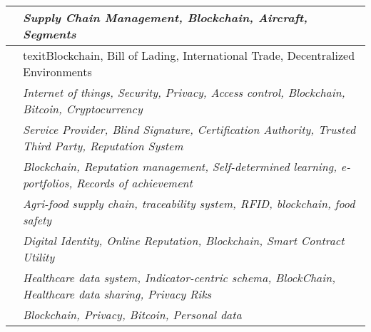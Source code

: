 \begin{longtable}{ |c|p{9cm}| }
	 \hline
 		\citet{2017_Madhwal} & \textit{Supply Chain Management, Blockchain, Aircraft, Segments} \\ 
	 \hline
	 \citet{2017_Naerland} & texit{Blockchain, Bill of Lading, International Trade, Decentralized Environments}\\
	 \hline
	 \citet{2017_Ouaddah} & \textit{Internet of things, Security, Privacy, Access control, Blockchain, Bitcoin, Cryptocurrency} \\ 
	 \hline
	 \citet{2016_Schaub} & \textit{Service Provider, Blind Signature, Certification Authority, Trusted Third Party, Reputation System} \\
	 \hline
	 \citet{2016_Sharples} & \textit{Blockchain, Reputation management, Self-determined learning, e-portfolios, Records of achievement} \\ 
	 \hline
	 \citet{2016_Tian} & \textit{Agri-food supply chain, traceability system, RFID, blockchain, food safety} \\ 
	 \hline
	 \citet{2016_Yasin} & \textit{Digital Identity, Online Reputation, Blockchain, Smart Contract Utility}\\ 
	 \hline
	\citet{2016_Yue} & \textit{Healthcare data system, Indicator-centric schema, BlockChain, Healthcare data sharing, Privacy Riks}\\ 
	 \hline
	 \citet{2015_Zyskind} & \textit{Blockchain, Privacy, Bitcoin, Personal data} \\ 
	 \hline
\end{longtable}


